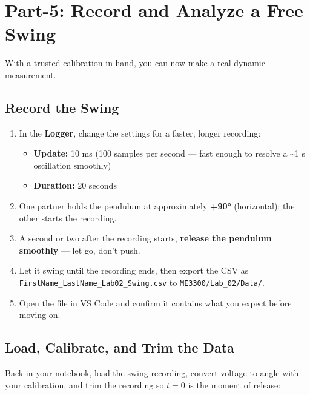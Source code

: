 \documentclass[
  12pt,
  letterpaper,
]{article}
\providecommand{\tightlist}{%
  \setlength{\itemsep}{0pt}\setlength{\parskip}{0pt}}
\begin{document}
\newpage{}

\section{Part-5: Record and Analyze a Free Swing}\label{sec-part-5}

With a trusted calibration in hand, you can now make a real dynamic
measurement.

\subsection{Record the Swing}\label{record-the-swing}

\begin{enumerate}
\def\labelenumi{\arabic{enumi}.}
\tightlist
\item
  In the \textbf{Logger}, change the settings for a faster, longer
  recording:

  \begin{itemize}
  \tightlist
  \item
    \textbf{Update:} 10 ms (100 samples per second --- fast enough to
    resolve a \textasciitilde1 s oscillation smoothly)
  \item
    \textbf{Duration:} 20 seconds
  \end{itemize}
\item
  One partner holds the pendulum at approximately \textbf{+90°}
  (horizontal); the other starts the recording.
\item
  A second or two after the recording starts, \textbf{release the
  pendulum smoothly} --- let go, don't push.
\item
  Let it swing until the recording ends, then export the CSV as
  \texttt{FirstName\_LastName\_Lab02\_Swing.csv} to
  \texttt{ME3300/Lab\_02/Data/}.
\item
  Open the file in VS Code and confirm it contains what you expect
  before moving on.
\end{enumerate}

\subsection{Load, Calibrate, and Trim the
Data}\label{load-calibrate-and-trim-the-data}

Back in your notebook, load the swing recording, convert voltage to
angle with your calibration, and trim the recording so \(t = 0\) is the
moment of release:
\end{document}
